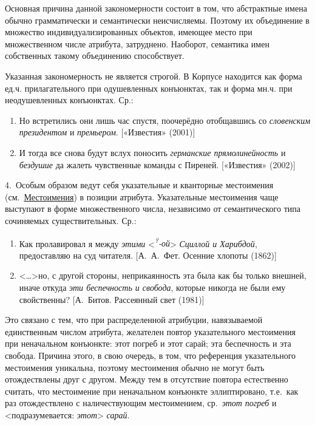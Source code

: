 Основная причина данной закономерности состоит в том, что абстрактные
имена обычно грамматически и семантически неисчисляемы. Поэтому их
объединение в множество индивидуализированных объектов, имеющее место
при множественном числе атрибута, затруднено. Наоборот, семантика имен
собственных такому объединению способствует.

Указанная закономерность не является строгой. В Корпусе находится как
форма ед.ч. прилагательного при одушевленных конъюнктах, так и форма
мн.ч. при неодушевленных конъюнктах. Ср.:

\begin{enumerate}
\def\labelenumi{(\arabic{enumi})}
\setcounter{enumi}{131}
\item
  Но встретились они лишь час спустя, поочерёдно отобщавшись со
  \emph{словенским президентом} и \emph{премьером}. {[}«Известия»
  (2001){]}
\item
  И тогда все снова будут вслух поносить \emph{германские
  прямолинейность} и \emph{бездушие} да жалеть чувственные команды с
  Пиреней. {[}«Известия» (2002){]}
\end{enumerate}

4.~Особым образом ведут себя указательные и кванторные местоимения
(см.~\underline{Местоимения}) в позиции атрибута. Указательные
местоимения чаще выступают в форме множественного числа, независимо от
семантического типа сочиняемых существительных. Ср.:

\begin{enumerate}
\def\labelenumi{(\arabic{enumi})}
\setcounter{enumi}{133}
\item
  Как пролавировал я между \emph{этими}
  \textless{}\emph{\textsuperscript{?}-ой}\textgreater{} \emph{Сциллой и
  Харибдой}, предоставляю на суд читателя. {[}А.~А.~Фет. Осенние хлопоты
  (1862){]}
\item
  \textless\ldots\textgreater но, с другой стороны, неприкаянность эта
  была как бы только внешней, иначе откуда \emph{эти беспечность и
  свобода}, которые никогда не были ему свойственны? {[}А.~Битов.
  Рассеянный свет (1981){]}
\end{enumerate}

Это связано с тем, что при распределенной атрибуции, навязываемой
единственным числом атрибута, желателен повтор указательного местоимения
при неначальном конъюнкте: этот погреб и этот сарай; эта беспечность и
эта свобода. Причина этого, в свою очередь, в том, что референция
указательного местоимения уникальна, поэтому местоимения обычно не могут
быть отождествлены друг с другом. Между тем в отсутствие повтора
естественно считать, что местоимение при неначальном конъюнкте
эллиптировано, т.е.~как раз отождествлено с наличествующим местоимением,
ср.~\emph{этот погреб} и \textless подразумевается:
\emph{этот}\textgreater{} \emph{сарай}.

